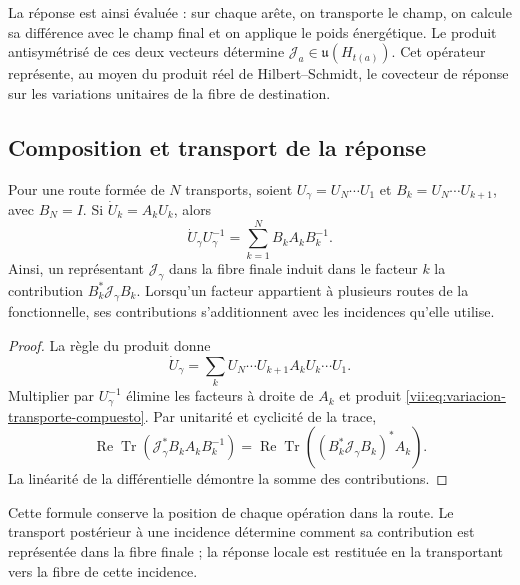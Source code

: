 La réponse est ainsi évaluée : sur chaque arête, on transporte le champ, on calcule sa différence avec le champ final et on applique le poids énergétique. Le produit antisymétrisé de ces deux vecteurs détermine \(\mathcal J_a\in\mathfrak u(H_{t(a)})\). Cet opérateur représente, au moyen du produit réel de Hilbert--Schmidt, le covecteur de réponse sur les variations unitaires de la fibre de destination.

\subsection{Composition et transport de la réponse}
\label{vii:subsec:composicion-respuesta}

\begin{proposition}
\label{vii:prop:composicion-respuesta}
Pour une route formée de \(N\) transports, soient
\(U_\gamma=U_N\cdots U_1\) et
\(B_k=U_N\cdots U_{k+1}\), avec \(B_N=I\).
Si \(\dot U_k=A_kU_k\), alors
\begin{equation}
 \dot U_\gamma U_\gamma^{-1}
 =\sum_{k=1}^N B_kA_kB_k^{-1}.
 \label{vii:eq:variacion-transporte-compuesto}
\end{equation}
Ainsi, un représentant \(\mathcal J_\gamma\) dans la fibre finale
induit dans le facteur \(k\) la contribution
\(B_k^*\mathcal J_\gamma B_k\). Lorsqu'un facteur appartient à plusieurs
routes de la fonctionnelle, ses contributions s'additionnent avec les incidences
qu'elle utilise.
\end{proposition}

\begin{proof}
La règle du produit donne
\[
 \dot U_\gamma=\sum_k
 U_N\cdots U_{k+1}A_kU_k\cdots U_1.
\]
Multiplier par \(U_\gamma^{-1}\) élimine les facteurs à droite
de \(A_k\) et produit \eqref{vii:eq:variacion-transporte-compuesto}.
Par unitarité et cyclicité de la trace,
\[
 \operatorname{Re}\operatorname{Tr}
   (\mathcal J_\gamma^*B_kA_kB_k^{-1})
 =\operatorname{Re}\operatorname{Tr}
   ((B_k^*\mathcal J_\gamma B_k)^*A_k).
\]
La linéarité de la différentielle démontre la somme des contributions.
\end{proof}

Cette formule conserve la position de chaque opération dans la route.
Le transport postérieur à une incidence détermine comment sa contribution
est représentée dans la fibre finale ; la réponse locale est restituée
en la transportant vers la fibre de cette incidence.

